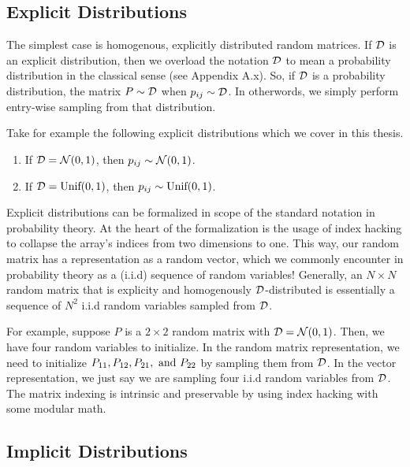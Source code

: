 \subsection{Explicit Distributions}

The simplest case is homogenous, explicitly distributed random matrices. If $\mathcal{D}$ is an explicit distribution, then we overload the notation $\mathcal{D}$ to mean a probability distribution in the classical sense (see Appendix A.x). So, if $\mathcal{D}$ is a probability distribution, the matrix $P \sim \mathcal{D}$ when $p_{ij} \sim \mathcal{D}$. In otherwords, we simply perform entry-wise sampling from that distribution.

Take for example the following explicit distributions which we cover in this thesis.

\begin{enumerate}
\item  If $\mathcal{D} = \mathcal{N}(0,1)$, then $p_{ij} \sim \mathcal{N}(0,1)$.
\item  If $\mathcal{D} = \text{Unif}(0,1)$, then $p_{ij} \sim \text{Unif}(0,1)$.
\end{enumerate}

\begin{remark}[Formalization]
Explicit distributions can be formalized in scope of the standard notation in probability theory. At the heart of the formalization is the usage of index hacking to collapse the array's indices from two dimensions to one. This way, our random matrix has a representation as a random vector, which we commonly encounter in probability theory as a (i.i.d) sequence of random variables! Generally, an $N \times N$ random matrix that is explicity and homogenously $\mathcal{D}$-distributed is essentially a sequence of $N^2$ i.i.d random variables sampled from $\mathcal{D}$.
\end{remark}

\begin{example}[Formalization]
For example, suppose $P$ is a $2 \times 2$ random matrix with $\mathcal{D} = \mathcal{N}(0,1)$. Then, we have four random variables to initialize. In the random matrix representation, we need to initialize $P_{11}, P_{12}, P_{21}, \text{ and } P_{22}$ by sampling them from $\mathcal{D}$. In the vector representation, we just say we are sampling four i.i.d random variables from $\mathcal{D}$. The matrix indexing is intrinsic and preservable by using index hacking with some modular math.
\end{example}

\subsection{Implicit Distributions}

